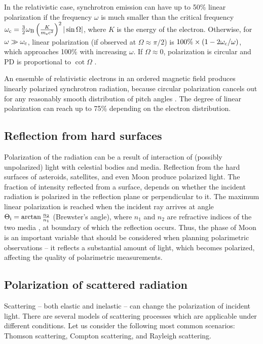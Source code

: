 In the relativistic case, synchrotron emission can have up to 50\% linear polarization if the frequency $\omega$ is much smaller than the critical frequency $\omega_{\mathrm{c}} = \frac{3}{2}\omega_{\mathrm{B}}\left(\frac{K}{m_{\mathrm{e}}c^2}\right)^2 |\sin\Omega|$, where $K$ is the energy of the electron.
Otherwise, for $\omega \gg \omega_{\mathrm{c}}$, linear polarization (if observed at $\Omega \approx \pi /2$) is  $100\% \times(1 - 2\omega_{\mathrm{c}}/\omega)$, which approaches 100\% with increasing $\omega$.
If $\Omega \approx 0$, polarization is circular and \gls{PD} is proportional to $\cot \Omega$ \citep{PolarizationInCosmicMedium}.

An ensemble of relativistic electrons in an ordered magnetic field produces linearly polarized synchrotron radiation, because circular polarization cancels out for any reasonably smooth distribution of pitch angles \citep{RadiationProcesses}.
The degree of linear polarization can reach up to 75\% depending on the electron distribution.

\subsection{Reflection from hard surfaces}
Polarization of the radiation can be a result of interaction of (possibly unpolarized) light with celestial bodies and media.
Reflection from the hard surfaces of asteroids, satellites, and even Moon produce polarized light.
The fraction of intensity reflected from a surface, depends on whether the incident radiation is polarized in the reflection plane or perpendicular to it.
The maximum linear polarization is reached when the incident ray arrives at angle $\Theta_{\mathrm{i}} = \arctan\frac{n_2}{n_1}$ (Brewster's angle), where $n_1$ and $n_2$ are refractive indices of the two media \citep{PolarizedLight2}, at boundary of which the reflection occurs.
Thus, the phase of Moon is an important variable that should be considered when planning polarimetric observations -- it reflects a substantial amount of light, which becomes polarized, affecting the quality of polarimetric measurements.

\subsection{Polarization of scattered radiation}
Scattering -- both elastic and inelastic -- can change the polarization of incident light.
There are several models of scattering processes which are applicable under different conditions.
Let us consider the following most common scenarios: Thomson scattering, Compton scattering, and Rayleigh scattering.

